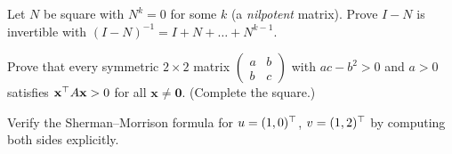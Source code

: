 \begin{exercise}
Let $N$ be square with $N^k=0$ for some $k$ (a \emph{nilpotent} matrix). Prove $I-N$ is invertible with $(I-N)^{-1}=I+N+\dots+N^{k-1}$.
\end{exercise}

\begin{exercise}
Prove that every symmetric $2\times2$ matrix $\begin{pmatrix}a&b\\b&c\end{pmatrix}$ with $ac-b^2>0$ and $a>0$ satisfies $\mathbf{x}^{\top} A\mathbf{x}>0$ for all $\mathbf{x}\ne\mathbf{0}$. (Complete the square.)
\end{exercise}

\begin{exercise}
Verify the Sherman--Morrison formula for $u=(1,0)^{\top}$, $v=(1,2)^{\top}$ by computing both sides explicitly.
\end{exercise}
